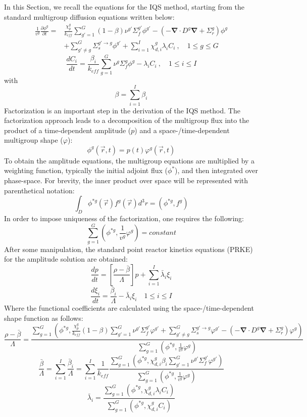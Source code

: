 \documentclass[12pt]{article}
\newcommand{\bs}[1]{\mathbf{#1}}
\renewcommand{\div}{\bs{\nabla}\! \cdot \!}
\newcommand{\grad}{\bs{\nabla}}
\newcommand{\keff}{k_\textit{eff}}
\newcommand{\be}{\begin{equation}}
\newcommand{\ee}{\end{equation}}
\begin{document}
In this Section, we recall the equations for the IQS method, starting from the standard multigroup diffusion equations written below:
\begin{align}
\frac{1}{v^g} \frac{\partial \phi^g }{\partial t} =& \frac{\chi_p^g}{\keff} \sum_{g'=1}^G (1-\beta) \nu^{g'} \Sigma_f^{g'} \phi^{g'} -  \left( -\div D^g \grad  + \Sigma_r^g \right) \phi^g  \nonumber \\
&  + \sum_{g'\neq g}^G\Sigma_s^{g'\to g} \phi^{g'}  + \sum_{i=1}^I\chi_{d,i}^g\lambda_i C_i \ , \quad 1 \le g \le G 
\end{align}
\be
\frac{dC_i}{dt} = \frac{\beta_i}{k_{eff}}\sum_{g=1}^G\nu^{g} \Sigma_f^g \phi^{g} - \lambda_i C_i \ , \quad 1 \le i \le I 
\ee
with
\be
\beta = \sum_{i=1}^I \beta_{i} 
\ee
Factorization is an important step in the derivation of the IQS method. The factorization approach leads to a decomposition of the multigroup flux into the product of a time-dependent amplitude ($p$) and a space-/time-dependent multigroup shape ($\varphi$):
\be
\phi^g(\vec{r},t)=p(t)\varphi^g(\vec{r},t)
\ee
To obtain the amplitude equations, the multigroup equations are multiplied by a weighting function, typically the initial adjoint flux ($\phi^*$), and then integrated over phase-space.  For brevity, the inner product over space will be represented with parenthetical notation:
\be
\int_D\phi^{*g}(\vec{r})f^g(\vec{r})d^3r=\left(\phi^{*g},f^g\right)
\ee
In order to impose uniqueness of the factorization, one requires the following:
\be
\sum_{g=1}^G\left(\phi^{*g},\frac{1}{v^g}\varphi^g\right) = \textit{constant}
\ee
After some manipulation, the standard point reactor kinetics equations (PRKE) for the amplitude solution are obtained:
\be
\frac{dp}{dt}=\left[\frac{\rho-\bar{\beta}}{\Lambda}\right]p+\sum_{i=1}^I\bar{\lambda}_i\xi_i
\ee
\be
\frac{d\xi_i}{dt}=\frac{\bar{\beta}_i}{\Lambda}-\bar{\lambda}_i\xi_i \quad 1 \le i \le I 
\ee
Where the functional coefficients are calculated using the space-/time-dependent shape function as follows:
\be
\frac{\rho-\bar{\beta}}{\Lambda}=\frac{ \sum_{g=1}^G\left(\phi^{*g},\frac{\chi_p^g}{k_{eff}}(1-\beta)\sum_{g'=1}^G \nu^{g'} \Sigma_f^{g'}\varphi^{g'} + \sum_{g'\neq g}^G\Sigma_s^{g'\to g} \varphi^{g'} -\left( -\div D^g \grad  + \Sigma_r^g \right)\varphi^g\right)}{\sum_{g=1}^G\left(\phi^{*g},\frac{1}{v^g}\varphi^g\right)}
\label{eq:rmb}
\ee
\be
\frac{\bar{\beta}}{\Lambda}=\sum_{i=1}^I\frac{\bar{\beta}_i}{\Lambda}=\sum_{i=1}^I\frac{1}{k_{eff}}\frac{\sum_{g=1}^G(\phi^{*g}, \chi_{d,i}^g\beta_i\sum_{g'=1}^G\nu^{g'} \Sigma_f^{g' }\varphi^{g'})}{\sum_{g=1}^G\left(\phi^{*g},\frac{1}{v^g}\varphi^g\right)}
\label{eq:b}
\ee
\be
\bar{\lambda}_i=\frac{\sum_{g=1}^G(\phi^{*g},\chi_{d,i}^g\lambda_i C_i)}{\sum_{g=1}^G(\phi^{*g},\chi_{d,i}^gC_i)}
\label{eq:l}
\ee
\end{document}
